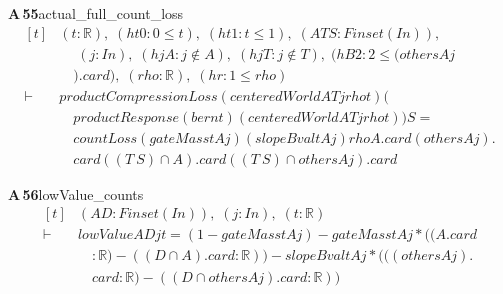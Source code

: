 \documentclass[conference]{IEEEtran}
\theoremstyle{definition}
\newcommand{\lean}[1]{\textsf{\footnotesize #1}}
\begin{document}
\noindent\textbf{A\,55}\quad\lean{actual\_full\_count\_loss}
{\footnotesize\[ \begin{aligned}[t]
&(\mathit{t} : \mathbb{R} ),\; (\mathit{ht0} : 0 \leq \mathit{t}),\; (\mathit{ht1} : \mathit{t} \leq 1),\; (\mathit{A} \mathit{T} \mathit{S} : \mathit{Finset} (\mathit{I} \mathit{n})),\\
&\quad \; (\mathit{j} : \mathit{I} \mathit{n}),\; (\mathit{hjA} : \mathit{j} \notin \mathit{A}),\; (\mathit{hjT} : \mathit{j} \notin \mathit{T}),\; (\mathit{hB2} : 2 \leq (\mathit{others} \mathit{A} \mathit{j}\\
&\quad ).\mathit{card}),\; (\mathit{rho} : \mathbb{R} ),\; (\mathit{hr} : 1 \leq \mathit{rho})\\
\vdash\;&\mathit{productCompressionLoss} (\mathit{centeredWorld} \mathit{A} \mathit{T} \mathit{j} \mathit{rho} \mathit{t}) (\\
&\quad \mathit{productResponse} (\mathit{bern} \mathit{t}) (\mathit{centeredWorld} \mathit{A} \mathit{T} \mathit{j} \mathit{rho} \mathit{t})) \mathit{S} =\\
&\quad \mathit{countLoss} (\mathit{gateMass} \mathit{t} \mathit{A} \mathit{j}) (\mathit{slopeBval} \mathit{t} \mathit{A} \mathit{j}) \mathit{rho} \mathit{A}.\mathit{card} (\mathit{others} \mathit{A} \mathit{j}).\\
&\quad \mathit{card} ((\mathit{T} \ \mathit{S}) \cap \mathit{A}).\mathit{card} ((\mathit{T} \ \mathit{S}) \cap \mathit{others} \mathit{A} \mathit{j}).\mathit{card}
\end{aligned} \]}

\noindent\textbf{A\,56}\quad\lean{lowValue\_counts}
{\footnotesize\[ \begin{aligned}[t]
&(\mathit{A} \mathit{D} : \mathit{Finset} (\mathit{I} \mathit{n})),\; (\mathit{j} : \mathit{I} \mathit{n}),\; (\mathit{t} : \mathbb{R} )\\
\vdash\;&\mathit{lowValue} \mathit{A} \mathit{D} \mathit{j} \mathit{t} = (1-\mathit{gateMass} \mathit{t} \mathit{A} \mathit{j}) -\mathit{gateMass} \mathit{t} \mathit{A} \mathit{j}*((\mathit{A}.\mathit{card}\\
&\quad :\mathbb{R} )-((\mathit{D} \cap \mathit{A}).\mathit{card}:\mathbb{R} )) -\mathit{slopeBval} \mathit{t} \mathit{A} \mathit{j}*(((\mathit{others} \mathit{A} \mathit{j}).\\
&\quad \mathit{card}:\mathbb{R} )-((\mathit{D} \cap \mathit{others} \mathit{A} \mathit{j}).\mathit{card}:\mathbb{R} ))
\end{aligned} \]}
\end{document}
